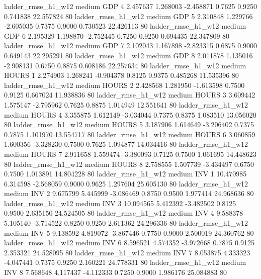     ladder_rmse_h1_w12     medium      GDP                 4  2.457637 1.268003 -2.458871 0.7625 0.9250  0.741838   22.557824 80
    ladder_rmse_h1_w12     medium      GDP                 5  2.310848 1.229766 -2.605035 0.7375 0.9000  0.730523   22.426113 80
    ladder_rmse_h1_w12     medium      GDP                 6  2.195329 1.198870 -2.752445 0.7250 0.9250  0.694435   22.347809 80
    ladder_rmse_h1_w12     medium      GDP                 7  2.102043 1.167898 -2.823315 0.6875 0.9000  0.649143   22.295291 80
    ladder_rmse_h1_w12     medium      GDP                 8  2.011878 1.135016 -2.908131 0.6750 0.8875  0.608186   22.257634 80
    ladder_rmse_h1_w12     medium    HOURS                 1  2.274903 1.268241 -0.904378 0.8125 0.9375  0.485268   11.535396 80
    ladder_rmse_h1_w12     medium    HOURS                 2  2.428568 1.281950 -1.613598 0.7500 0.9125  0.667024   11.938836 80
    ladder_rmse_h1_w12     medium    HOURS                 3  3.609442 1.575147 -2.795962 0.7625 0.8875  1.014949   12.551641 80
    ladder_rmse_h1_w12     medium    HOURS                 4  3.355875 1.612149 -3.034044 0.7375 0.8375  1.083510   13.056020 80
    ladder_rmse_h1_w12     medium    HOURS                 5  3.187906 1.614649 -3.206402 0.7375 0.7875  1.101970   13.554717 80
    ladder_rmse_h1_w12     medium    HOURS                 6  3.060859 1.600356 -3.328230 0.7500 0.7625  1.094877   14.034416 80
    ladder_rmse_h1_w12     medium    HOURS                 7  2.911658 1.559474 -3.380093 0.7125 0.7500  1.061695   14.448623 80
    ladder_rmse_h1_w12     medium    HOURS                 8  2.758555 1.507739 -3.434497 0.6750 0.7500  1.013891   14.804228 80
    ladder_rmse_h1_w12     medium      INV                 1 10.470985 6.314598 -2.568059 0.9000 0.9625  1.297604   25.605130 80
    ladder_rmse_h1_w12     medium      INV                 2  9.675799 5.445999 -3.086469 0.8750 0.9500  1.977414   24.968636 80
    ladder_rmse_h1_w12     medium      INV                 3 10.094565 5.412392 -3.482502 0.8125 0.9500  2.635150   24.524505 80
    ladder_rmse_h1_w12     medium      INV                 4  9.588378 5.105140 -3.714522 0.8250 0.9250  2.611362   24.296336 80
    ladder_rmse_h1_w12     medium      INV                 5  9.138592 4.819072 -3.867446 0.7750 0.9000  2.500019   24.360762 80
    ladder_rmse_h1_w12     medium      INV                 6  8.596521 4.574352 -3.972668 0.7875 0.9125  2.353321   24.528095 80
    ladder_rmse_h1_w12     medium      INV                 7  8.053875 4.333323 -4.047441 0.7375 0.9250  2.160221   24.778331 80
    ladder_rmse_h1_w12     medium      INV                 8  7.568648 4.117437 -4.112333 0.7250 0.9000  1.986176   25.084883 80
